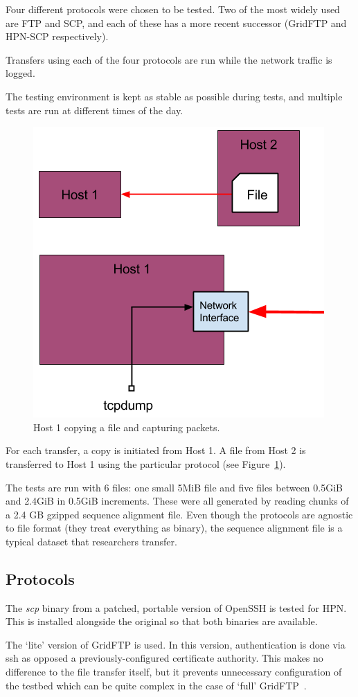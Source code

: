\documentclass{sig-alternate-05-2015}
\begin{document}
Four different protocols were chosen to be tested. Two of the most widely used are FTP and SCP, and each of these has a more recent successor (GridFTP and HPN-SCP respectively).

Transfers using each of the four protocols are run while the network traffic is logged.

The testing environment is kept as stable as possible during tests, and multiple tests are run at different times of the day.

\begin{figure}[t]
\centering
	\includegraphics[width=.6\linewidth]{img/transfer_example.png}
\caption{Host 1 copying a file and capturing packets.\label{fig:copy_example}}
\end{figure}
For each transfer, a copy is initiated from Host 1. A file from Host 2 is transferred to Host 1 using the particular protocol (see Figure~\ref{fig:copy_example}).

The tests are run with 6 files: one small 5MiB file and five files between 0.5GiB and 2.4GiB in 0.5GiB increments. These were all generated by reading chunks of a 2.4 GB gzipped sequence alignment file. Even though the protocols are agnostic to file format (they treat everything as binary), the sequence alignment file is a typical dataset that researchers transfer.

\subsection{Protocols}
The \textit{scp} binary from a patched, portable version of OpenSSH is tested for HPN\@. This is installed alongside the original so that both binaries are available.

The `lite' version of GridFTP is used. In this version, authentication is done via ssh as opposed a previously-configured certificate authority. This makes no difference to the file transfer itself, but it prevents unnecessary configuration of the testbed which can be quite complex in the case of `full' GridFTP~\cite{gridftplite}.
\end{document}
